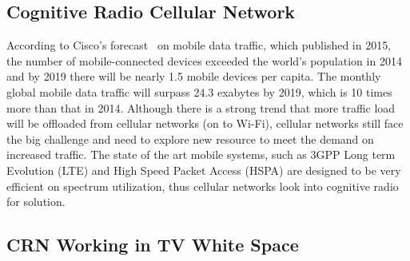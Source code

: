 %
%

\subsection{Cognitive Radio Cellular Network}
According to Cisco's forecast~\cite{Cisco_report_2015} on mobile data traffic, which published in 2015, the number of mobile-connected devices exceeded the world’s population in 2014 and by 2019 there will be nearly 1.5 mobile devices per capita.
The monthly global mobile data traffic will surpass 24.3 exabytes by 2019, which is 10 times more than that in 2014.
Although there is a strong trend that more traffic load will be offloaded from cellular networks (on to Wi-Fi), cellular networks still face the big challenge and need to explore new resource to meet the demand on increased traffic.
The state of the art mobile systems, such as 3GPP Long term Evolution (\gls{LTE}) and High Speed Packet Access (\gls{HSPA}) are designed to be very efficient on spectrum utilization, thus cellular networks look into cognitive radio for solution.


\subsection{CRN Working in TV White Space}
\label{TVWS}

